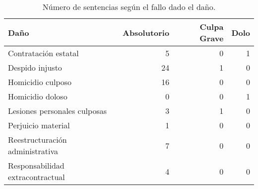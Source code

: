 \begin{table}[!htbp]
\centering
\caption{Número de sentencias según el fallo dado el daño.} 
\label{tab:danofallo}
\begin{tabular}{lrrr}
  \hline
Daño & Absolutorio & Culpa Grave & Dolo \\ 
  \hline
Contratación estatal &  5 &  0 &  1 \\ 
  Despido injusto & 24 &  1 &  0 \\ 
  Homicidio culposo & 16 &  0 &  0 \\ 
  Homicidio doloso &  0 &  0 &  1 \\ 
  Lesiones personales culposas &  3 &  1 &  0 \\ 
  Perjuicio material &  1 &  0 &  0 \\ 
  Reestructuración administrativa &  7 &  0 &  0 \\ 
  Responsabilidad extracontractual &  4 &  0 &  0 \\ 
   \hline
\end{tabular}
\end{table}
